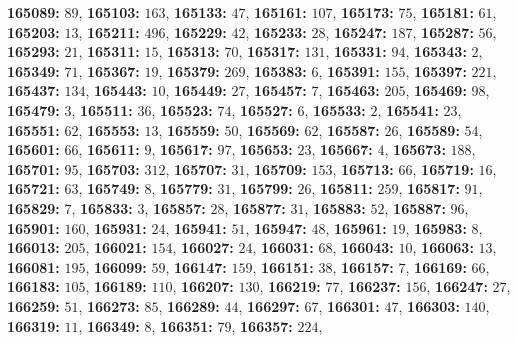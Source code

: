 \textsf{\bfseries 165089:} $89$, \textsf{\bfseries 165103:} $163$, \textsf{\bfseries 165133:} $47$, \textsf{\bfseries 165161:} $107$, \textsf{\bfseries 165173:} $75$, \textsf{\bfseries 165181:} $61$, \textsf{\bfseries 165203:} $13$, \textsf{\bfseries 165211:} $496$, \textsf{\bfseries 165229:} $42$, \textsf{\bfseries 165233:} $28$, \textsf{\bfseries 165247:} $187$, \textsf{\bfseries 165287:} $56$, \textsf{\bfseries 165293:} $21$, \textsf{\bfseries 165311:} $15$, \textsf{\bfseries 165313:} $70$, \textsf{\bfseries 165317:} $131$, \textsf{\bfseries 165331:} $94$, \textsf{\bfseries 165343:} $2$, \textsf{\bfseries 165349:} $71$, \textsf{\bfseries 165367:} $19$, \textsf{\bfseries 165379:} $269$, \textsf{\bfseries 165383:} $6$, \textsf{\bfseries 165391:} $155$, \textsf{\bfseries 165397:} $221$, \textsf{\bfseries 165437:} $134$, \textsf{\bfseries 165443:} $10$, \textsf{\bfseries 165449:} $27$, \textsf{\bfseries 165457:} $7$, \textsf{\bfseries 165463:} $205$, \textsf{\bfseries 165469:} $98$, \textsf{\bfseries 165479:} $3$, \textsf{\bfseries 165511:} $36$, \textsf{\bfseries 165523:} $74$, \textsf{\bfseries 165527:} $6$, \textsf{\bfseries 165533:} $2$, \textsf{\bfseries 165541:} $23$, \textsf{\bfseries 165551:} $62$, \textsf{\bfseries 165553:} $13$, \textsf{\bfseries 165559:} $50$, \textsf{\bfseries 165569:} $62$, \textsf{\bfseries 165587:} $26$, \textsf{\bfseries 165589:} $54$, \textsf{\bfseries 165601:} $66$, \textsf{\bfseries 165611:} $9$, \textsf{\bfseries 165617:} $97$, \textsf{\bfseries 165653:} $23$, \textsf{\bfseries 165667:} $4$, \textsf{\bfseries 165673:} $188$, \textsf{\bfseries 165701:} $95$, \textsf{\bfseries 165703:} $312$, \textsf{\bfseries 165707:} $31$, \textsf{\bfseries 165709:} $153$, \textsf{\bfseries 165713:} $66$, \textsf{\bfseries 165719:} $16$, \textsf{\bfseries 165721:} $63$, \textsf{\bfseries 165749:} $8$, \textsf{\bfseries 165779:} $31$, \textsf{\bfseries 165799:} $26$, \textsf{\bfseries 165811:} $259$, \textsf{\bfseries 165817:} $91$, \textsf{\bfseries 165829:} $7$, \textsf{\bfseries 165833:} $3$, \textsf{\bfseries 165857:} $28$, \textsf{\bfseries 165877:} $31$, \textsf{\bfseries 165883:} $52$, \textsf{\bfseries 165887:} $96$, \textsf{\bfseries 165901:} $160$, \textsf{\bfseries 165931:} $24$, \textsf{\bfseries 165941:} $51$, \textsf{\bfseries 165947:} $48$, \textsf{\bfseries 165961:} $19$, \textsf{\bfseries 165983:} $8$, \textsf{\bfseries 166013:} $205$, \textsf{\bfseries 166021:} $154$, \textsf{\bfseries 166027:} $24$, \textsf{\bfseries 166031:} $68$, \textsf{\bfseries 166043:} $10$, \textsf{\bfseries 166063:} $13$, \textsf{\bfseries 166081:} $195$, \textsf{\bfseries 166099:} $59$, \textsf{\bfseries 166147:} $159$, \textsf{\bfseries 166151:} $38$, \textsf{\bfseries 166157:} $7$, \textsf{\bfseries 166169:} $66$, \textsf{\bfseries 166183:} $105$, \textsf{\bfseries 166189:} $110$, \textsf{\bfseries 166207:} $130$, \textsf{\bfseries 166219:} $77$, \textsf{\bfseries 166237:} $156$, \textsf{\bfseries 166247:} $27$, \textsf{\bfseries 166259:} $51$, \textsf{\bfseries 166273:} $85$, \textsf{\bfseries 166289:} $44$, \textsf{\bfseries 166297:} $67$, \textsf{\bfseries 166301:} $47$, \textsf{\bfseries 166303:} $140$, \textsf{\bfseries 166319:} $11$, \textsf{\bfseries 166349:} $8$, \textsf{\bfseries 166351:} $79$, \textsf{\bfseries 166357:} $224$, 
